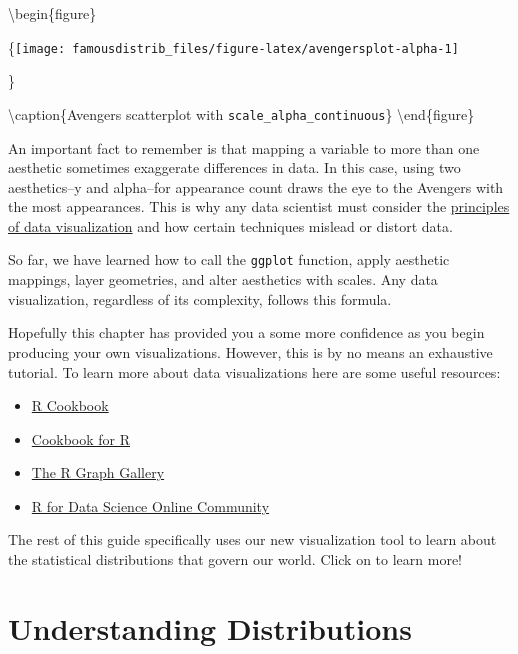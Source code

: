 \documentclass[
]{article}
\providecommand{\tightlist}{%
  \setlength{\itemsep}{0pt}\setlength{\parskip}{0pt}}
\begin{document}
\textbackslash begin\{figure\}

\{\centering \texttt{[image: famousdistrib\_files/figure-latex/avengersplot-alpha-1]}

\}

\textbackslash caption\{Avengers scatterplot with \texttt{scale\_alpha\_continuous}\}\label{fig:avengersplot-alpha}
\textbackslash end\{figure\}

An important fact to remember is that mapping a variable to more than one aesthetic sometimes exaggerate differences in data. In this case, using two aesthetics--y and alpha--for appearance count draws the eye to the Avengers with the most appearances. This is why any data scientist must consider the \href{https://socviz.co/index.html\#preface}{principles of data visualization} and how certain techniques mislead or distort data.

So far, we have learned how to call the \texttt{ggplot} function, apply aesthetic mappings, layer geometries, and alter aesthetics with scales. Any data visualization, regardless of its complexity, follows this formula.

Hopefully this chapter has provided you a some more confidence as you begin producing your own visualizations. However, this is by no means an exhaustive tutorial. To learn more about data visualizations here are some useful resources:

\begin{itemize}
\tightlist
\item
  \href{https://www.amazon.com/gp/product/0596809158/ref=as_li_tf_tl?ie=UTF8\&camp=1789\&creative=9325\&creativeASIN=0596809158\&linkCode=as2\&tag=cooforr09-20}{R Cookbook}
\item
  \href{http://www.cookbook-r.com/}{Cookbook for R}
\item
  \href{https://www.r-graph-gallery.com/index.html}{The R Graph Gallery}
\item
  \href{https://www.rfordatasci.com/}{R for Data Science Online Community}
\end{itemize}

The rest of this guide specifically uses our new visualization tool to learn about the statistical distributions that govern our world. Click on to learn more!

\hypertarget{Distributions}{%
\section{Understanding Distributions}\label{Distributions}}
\end{document}
